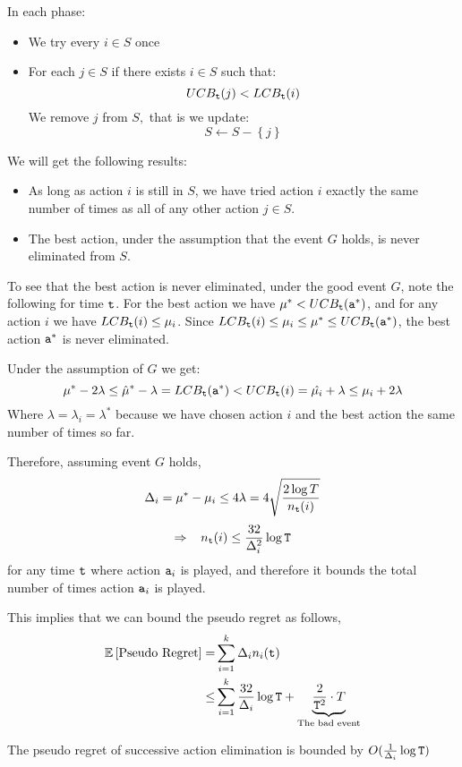 In each phase:
\begin{itemize}
\item We try every $i\in S$ once
\item For each $j\in S$ if there exists $i\in S$ such that:
\[
UCB_{{\tt t}}(j)<LCB_{{\tt t}}(i)
\]
 We remove $j$ from $S,$ that is we update:
\[
S\leftarrow S-\left\{ j\right\}
\]
\end{itemize}
We will get the following results:
\begin{itemize}
\item As long as action $i$ is still in $S$, we have tried action $i$ exactly the
same number of times as all of any other action $j\in S$.
\item The best action, under the assumption that the event $G$ holds, is never eliminated
from $S$.
\end{itemize}
To see that the best action is never eliminated, under the good event $G$, note the following for time ${\tt t}$. For the best action we have $\mu^*< UCB_{{\tt t}}({\tt a}^*)$, and for any action $i$ we have $LCB_{\tt t}(i)\leq \mu_i$. Since $LCB_{\tt t}(i)\leq \mu_i\leq \mu^*\leq UCB_{\tt t}({\tt a}^*)$, the best action ${\tt a}^*$ is never eliminated.

Under the assumption of $G$ we get:
\[
\mu^{*}-2\lambda\le\hat{\mu}^{*}-\lambda=LCB_{\tt t}({\tt a}^*)<UCB_{\tt t}(i)=\hat{\mu_{i}}+\lambda\leq\mu_{i}+2\lambda
\]
Where $\lambda=\lambda_{i}=\lambda^{*}$ because we have chosen action $i$ and the best action the same number of times so far.

Therefore, assuming event $G$ holds,
\[
\Delta_{i}=\mu^{*}-\mu_{i}\le4\lambda=4\sqrt{\frac{2\log
T}{n_{{\tt t}}(i)}}
\]
\[
\Rightarrow\;\;\; n_{{\tt t}}(i)\le\frac{32}{\Delta_{i}^{2}}\log {\tt T}
\]
for any time ${\tt t}$ where action ${\tt a}_i$ is played, and therefore it bounds the total number of times action ${\tt a}_i$ is played.

This implies that we can bound the pseudo regret as follows,
\begin{align*}
\mathbb{E}\left[\text{Pseudo Regret}\right]  = &  \sum_{i=1}^{k}\Delta_{i}n_{i}({\tt t})\\
  \le &  \sum_{i=1}^{k}\frac{32}{\Delta_{i}}\log {\tt T}
  +\underbrace{\frac{2}{{\tt T}^{2}}\cdot T}_{\text{The bad event}}
\end{align*}


\begin{theorem}
\label{thm:MAB:SE1}
The pseudo regret of successive action elimination is bounded by $O(\frac{1}{\Delta_{i}}\log {\tt T})$
\end{theorem}

